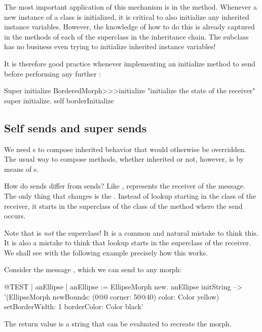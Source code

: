 \documentclass[a4paper,10pt,twoside]{book}
\begin{document}
The most important application of this mechanism is in the  method.
Whenever a new instance of a class is initialized, it is critical to also initialize any inherited instance variables.
However, the knowledge of how to do this is already captured in the  methods of each of the superclass in the inheritance chain.
The subclass has no business even trying to initialize inherited instance variables!

It is therefore good practice whenever implementing an initialize method to send  before performing any further :

\begin{method}[morphinit]{Super initialize}
BorderedMorph>>>initialize
	"initialize the state of the receiver"
	super initialize.
	self borderInitialize
\end{method}


\subsection{Self sends and super sends}

We need \super {}s to compose inherited behavior that would otherwise be overridden.
The usual way to compose methods, whether inherited or not, however, is by means of \self {}s.

How do \self sends differ from \super sends?
Like \self, \super represents the receiver of the message.
The only thing that changes is the .
Instead of lookup starting in the class of the receiver, it starts in the superclass of the class of the method where the \super send occurs.

Note that \super is \emph{not} the superclass!
It is a common and natural mistake to think this.
It is also a mistake to think that lookup starts in the superclass of the receiver.
We shall see with the following example precisely how this works.

Consider the message , which we can send to any morph:
\begin{code}{@TEST | anEllipse | anEllipse := EllipseMorph new.}
anEllipse initString --> '(EllipseMorph newBounds: (0@0 corner: 50@40) color: Color yellow) setBorderWidth: 1 borderColor: Color black'
\end{code}
The return value is a string that can be evaluated to recreate the morph.
\end{document}
